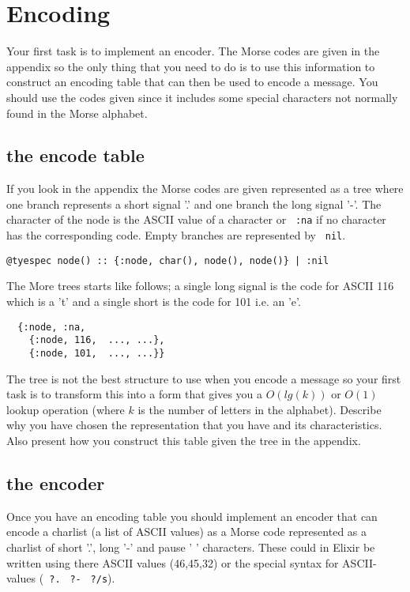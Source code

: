 \documentclass[a4paper,11pt]{article}
\begin{document}
\section*{Encoding}

Your first task is to implement an encoder. The Morse codes are given
in the appendix so the only thing that you need to do is to use this
information to construct an encoding table that can then be used to
encode a message. You should use the codes given since it includes some
special characters not normally found in the Morse alphabet.

\subsection*{the encode table}

If you look in the appendix the Morse codes are given represented as a
tree where one branch represents a short signal '.' and one branch the
long signal '-'.  The character of the node is the ASCII value of a
character or \verb+ :na+ if no character has the corresponding
code. Empty branches are represented by \verb+ nil+.

\begin{verbatim}
@tyespec node() :: {:node, char(), node(), node()} | :nil
\end{verbatim}

The More trees starts like follows; a single long signal is the code
for ASCII 116 which is a 't' and a single short is the code for 101
i.e. an 'e'.

\begin{verbatim}
  {:node, :na,
    {:node, 116,  ..., ...},
    {:node, 101,  ..., ...}}
\end{verbatim}

The tree is not the best structure to use when you encode a message so
your first task is to transform this into a form that gives you a
$O(lg(k))$ or $O(1)$ lookup operation (where $k$ is the number of
letters in the alphabet). Describe why you have chosen the
representation that you have and its characteristics. Also present how
you construct this table given the tree in the appendix.

\subsection*{the encoder}

Once you have an encoding table you should implement an encoder that
can encode a charlist (a list of ASCII values) as a Morse code
represented as a charlist of short '.', long '-' and pause ' '
characters. These could in Elixir be written using there ASCII values
(46,45,32) or the special syntax for ASCII-values (\verb+ ?.+
\verb+ ?-+ \verb+ ?/s+). 
\end{document}
